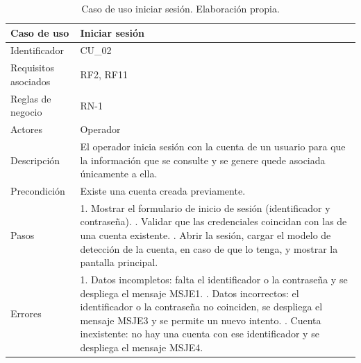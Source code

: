 \begin{table}[H]
\centering
\small
\begin{tabularx}{\textwidth}{|L{3.0cm}|Y|}
\hline
\textbf{Caso de uso} & \textbf{Iniciar sesión} \\
\hline
Identificador & CU\_02 \\
\hline
Requisitos asociados & RF2, RF11 \\
\hline
Reglas de negocio & RN-1 \\
\hline
Actores & Operador \\
\hline
Descripción & El operador inicia sesión con la cuenta de un usuario para que la información que se consulte y se genere quede asociada únicamente a ella. \\
\hline
Precondición & Existe una cuenta creada previamente. \\
\hline
Pasos & 1. Mostrar el formulario de inicio de sesión (identificador y contraseña). . Validar que las credenciales coincidan con las de una cuenta existente. . Abrir la sesión, cargar el modelo de detección de la cuenta, en caso de que lo tenga, y mostrar la pantalla principal. \\
\hline
Errores & 1. Datos incompletos: falta el identificador o la contraseña y se despliega el mensaje MSJE1. . Datos incorrectos: el identificador o la contraseña no coinciden, se despliega el mensaje MSJE3 y se permite un nuevo intento. . Cuenta inexistente: no hay una cuenta con ese identificador y se despliega el mensaje MSJE4. \\
\hline
\end{tabularx}
\caption{Caso de uso iniciar sesión. Elaboración propia.}
\label{tab:cu02}
\end{table}

